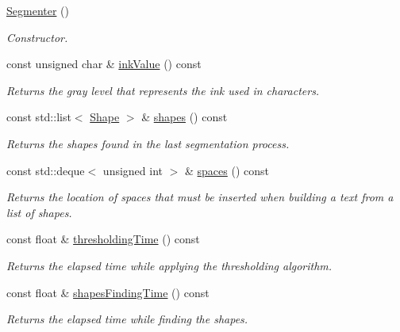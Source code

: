 \begin{CompactItemize}
\item 
\hyperlink{class_segmenter_d39ec3bda31be180820aa0bdca7b125d}{Segmenter} ()
\begin{CompactList}\small\item\em Constructor. \item\end{CompactList}\item 
const unsigned char \& \hyperlink{class_segmenter_e9bc56ddcbe5ea4abb40fcc85e3d9fbe}{inkValue} () const 
\begin{CompactList}\small\item\em Returns the gray level that represents the ink used in characters. \item\end{CompactList}\item 
const std::list$<$ \hyperlink{class_shape}{Shape} $>$ \& \hyperlink{class_segmenter_7ddded12f26e94e6f5cba2752d2c4142}{shapes} () const 
\begin{CompactList}\small\item\em Returns the shapes found in the last segmentation process. \item\end{CompactList}\item 
const std::deque$<$ unsigned int $>$ \& \hyperlink{class_segmenter_eed49de2d6548ae8016bf6c9c78cec99}{spaces} () const 
\begin{CompactList}\small\item\em Returns the location of spaces that must be inserted when building a text from a list of shapes. \item\end{CompactList}\item 
const float \& \hyperlink{class_segmenter_9114d0f3934b43478fb55077b7722d3d}{thresholdingTime} () const 
\begin{CompactList}\small\item\em Returns the elapsed time while applying the thresholding algorithm. \item\end{CompactList}\item 
const float \& \hyperlink{class_segmenter_8d7304b35b1891b1c7154a3ac2ff2c4b}{shapesFindingTime} () const 
\begin{CompactList}\small\item\em Returns the elapsed time while finding the shapes. \item\end{CompactList}\item 

\end{CompactItemize}
